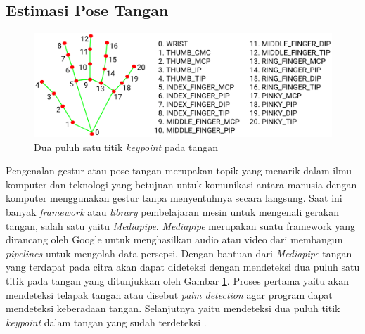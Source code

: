 \subsection{Estimasi Pose Tangan}
\begin{figure}[!h]
  \centering
	\includegraphics[width=0.7\linewidth]{../Gambar/hand_landmarks.png}
	\caption{Dua puluh satu titik \textit{keypoint} pada tangan \parencite{mediapipe}}
	\label{fig:tangan}
\end{figure}
Pengenalan gestur atau pose tangan merupakan topik yang menarik dalam ilmu komputer dan teknologi yang betujuan untuk komunikasi antara manusia dengan komputer menggunakan gestur tanpa menyentuhnya secara langsung. Saat ini banyak \textit{framework} atau \textit{library} pembelajaran mesin untuk mengenali gerakan tangan, salah satu yaitu \textit{Mediapipe}. \textit{Mediapipe} merupakan suatu framework yang dirancang oleh Google untuk menghasilkan audio atau video dari membangun \textit{pipelines} untuk mengolah data persepsi. Dengan bantuan dari \textit{Mediapipe} tangan yang terdapat pada citra akan dapat dideteksi dengan mendeteksi dua puluh satu titik pada tangan yang ditunjukkan oleh Gambar \ref*{fig:tangan}. Proses pertama yaitu akan mendeteksi telapak tangan atau disebut \textit{palm detection} agar program dapat mendeteksi keberadaan tangan. Selanjutnya yaitu mendeteksi dua puluh titik \textit{keypoint} dalam tangan yang sudah terdeteksi \parencite{UniversitasDinamika}. 


